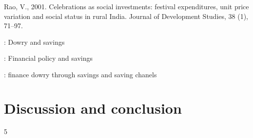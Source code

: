 \documentclass[a4paper, 11pt, onecolumn]{article}
\begin{document}
Rao, V., 2001. Celebrations as social investments: festival expenditures, unit price variation and social status in rural
India. Journal of Development Studies, 38 (1), 71–97.




\cite{Heyer1992} : Dowry and savings

\cite{Goedecke2018} : Financial policy and savings

\cite{Anukriti2020} : finance dowry through savings and saving chanels






\section{Discussion and conclusion}
\label{section:conclusion}











\newpage
%


\clearpage
\newpage
\setcounter{tocdepth}5
\tableofcontents

\end{document}
